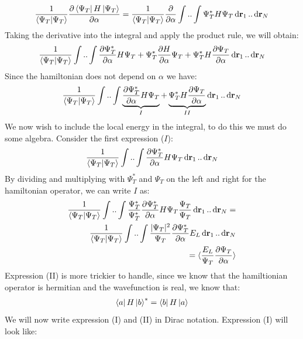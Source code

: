 \documentclass[a4paper, 10pt]{article}
\begin{document}
\begin{appendices}
\begin{align}
		\frac{1}{\braket{\Psi_{T}}}\pdv{\bra{\Psi_{T}}H\ket{\Psi_{T}}}{\alpha}
		=
		\frac{1}{\braket{\Psi_{T}}}\pdv{\alpha}\int..\int\Psi_{T}^{*}H\Psi_{T}\dd{\bold{r}_{1}}..\dd{\bold{r}_{N}}
		\end{align}
		Taking the derivative into the integral and apply the product rule, we will obtain:
		\begin{align}
		\frac{1}{\braket{\Psi_{T}}}\int..\int\pdv{\Psi_{T}^{*}}{\alpha}H\Psi_{T}
		+   \Psi_{T}^{*}\pdv{H}{\alpha}\Psi_{T}
		+   \Psi_{T}^{*}H\pdv{\Psi_{T}}{\alpha}\dd{\bold{r}_{1}}..\dd{\bold{r}_{N}}
		\end{align}
		Since the hamiltonian does not depend on $\alpha$ we have:
		\begin{align}
		\frac{1}{\braket{\Psi_{T}}}\int..\int\underbrace{\pdv{\Psi_{T}^{*}}{\alpha}H\Psi_{T}}_{I}
		+   \underbrace{\Psi_{T}^{*}H\pdv{\Psi_{T}}{\alpha}}_{II}\dd{\bold{r}_{1}}..\dd{\bold{r}_{N}}
		\end{align}
		We now wish to include the local energy in the integral, to do this we must
		do some algebra. Consider the first expression ($I$):
		\begin{align}
		\frac{1}{\braket{\Psi_{T}}}\int..\int \pdv{\Psi_{T}^{*}}{\alpha}H\Psi_{T}\dd{\bold{r}_{1}}..\dd{\bold{r}_{N}}
		\end{align}
		By dividing and multiplying with $\Psi_{T}^{*}$ and $\Psi_{T}$ on the left and right for the
		hamiltonian operator, we can write $I$ as:
		\begin{align}
		\begin{split}
		\frac{1}{\braket{\Psi_{T}}}\int..\int \frac{\Psi_{T}^{*}}{\Psi_{T}^{*}}\pdv{\Psi_{T}^{*}}{\alpha}H\Psi_{T}\frac{\Psi_{T}}{\Psi_{T}}\dd{\bold{r}_{1}}..\dd{\bold{r}_{N}}
		=
		\\
		\frac{1}{\braket{\Psi_{T}}}\int..\int \frac{|\Psi_{T}|^{2}}{\Psi_{T}}\pdv{\Psi_{T}^{*}}{\alpha}E_{L}\dd{\bold{r}_{1}}..\dd{\bold{r}_{N}}
		\\
		= \langle \frac{E_{L}}{\Psi_{T}}\pdv{\Psi_{T}}{\alpha}\rangle
		\label{result1}
		\end{split}
		\end{align}
		Expression (II) is more trickier to handle, since we know that the hamiltionian
		operator is hermitian and the wavefunction is real, we know that:
		\begin{align}
		\bra{a}H\ket{b}^{*} = \bra{b}H\ket{a}
		\end{align}
		We will now write expression (I) and (II) in Dirac notation. Expression (I) will
		look like:
		\begin{align}

\end{align}
\end{appendices}
\end{document}
